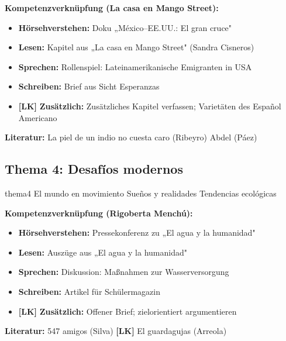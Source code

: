 \documentclass[11pt,a4paper]{article}
\newcommand{\lmark}{\textcolor{accentorange}{\textbf{[LK]}}}
\begin{document}
\textbf{Kompetenzverknüpfung (La casa en Mango Street):}
\begin{itemize}[leftmargin=1cm, itemsep=1pt]
\item \textbf{Hörsehverstehen:} Doku „México--EE.UU.: El gran cruce"
\item \textbf{Lesen:} Kapitel aus „La casa en Mango Street" (Sandra Cisneros)
\item \textbf{Sprechen:} Rollenspiel: Lateinamerikanische Emigranten in USA
\item \textbf{Schreiben:} Brief aus Sicht Esperanzas
\item \lmark{} \textbf{Zusätzlich:} Zusätzliches Kapitel verfassen; Varietäten des Español Americano
\end{itemize}

\begin{literaturbox}
\textbf{Literatur:} La piel de un indio no cuesta caro (Ribeyro) \textbullet{} Abdel (Páez)
\end{literaturbox}

\subsection{Thema 4: Desafíos modernos}

\begin{themenbox}[Schwerpunkte]{thema4}
El mundo en movimiento \textbullet{} Sueños y realidades \textbullet{} Tendencias ecológicas
\end{themenbox}

\textbf{Kompetenzverknüpfung (Rigoberta Menchú):}
\begin{itemize}[leftmargin=1cm, itemsep=1pt]
\item \textbf{Hörsehverstehen:} Pressekonferenz zu „El agua y la humanidad"
\item \textbf{Lesen:} Auszüge aus „El agua y la humanidad"
\item \textbf{Sprechen:} Diskussion: Maßnahmen zur Wasserversorgung
\item \textbf{Schreiben:} Artikel für Schülermagazin
\item \lmark{} \textbf{Zusätzlich:} Offener Brief; zielorientiert argumentieren
\end{itemize}

\begin{literaturbox}
\textbf{Literatur:} 547 amigos (Silva) \textbullet{} \lmark{} El guardagujas (Arreola)
\end{literaturbox}
\end{document}
